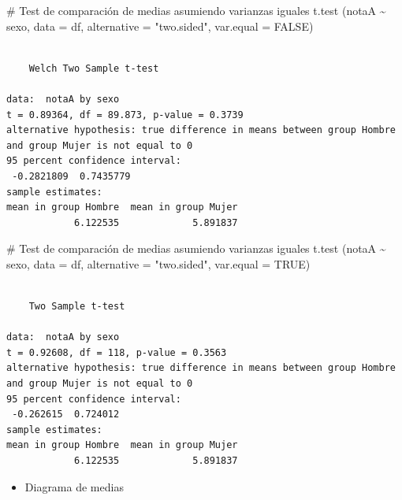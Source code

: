 \documentclass[
  a4paper,
]{scrreport}
\newenvironment{Shaded}{\begin{snugshade}}{\end{snugshade}}
\newcommand{\AttributeTok}[1]{\textcolor[rgb]{0.40,0.45,0.13}{#1}}
\newcommand{\CommentTok}[1]{\textcolor[rgb]{0.37,0.37,0.37}{#1}}
\newcommand{\ConstantTok}[1]{\textcolor[rgb]{0.56,0.35,0.01}{#1}}
\newcommand{\FunctionTok}[1]{\textcolor[rgb]{0.28,0.35,0.67}{#1}}
\newcommand{\NormalTok}[1]{\textcolor[rgb]{0.00,0.23,0.31}{#1}}
\newcommand{\SpecialCharTok}[1]{\textcolor[rgb]{0.37,0.37,0.37}{#1}}
\newcommand{\StringTok}[1]{\textcolor[rgb]{0.13,0.47,0.30}{#1}}
\providecommand{\tightlist}{%
  \setlength{\itemsep}{0pt}\setlength{\parskip}{0pt}}\usepackage{longtable,booktabs,array}
\theoremstyle{definition}
\theoremstyle{definition}
\theoremstyle{remark}
\begin{document}
\begin{Shaded}
\begin{Highlighting}[]
\CommentTok{\# Test de comparación de medias asumiendo varianzas iguales}
\FunctionTok{t.test}\NormalTok{ (notaA }\SpecialCharTok{\textasciitilde{}}\NormalTok{ sexo, }\AttributeTok{data =}\NormalTok{ df, }\AttributeTok{alternative =} \StringTok{"two.sided"}\NormalTok{, }\AttributeTok{var.equal =} \ConstantTok{FALSE}\NormalTok{)}
\end{Highlighting}
\end{Shaded}

\begin{verbatim}

    Welch Two Sample t-test

data:  notaA by sexo
t = 0.89364, df = 89.873, p-value = 0.3739
alternative hypothesis: true difference in means between group Hombre and group Mujer is not equal to 0
95 percent confidence interval:
 -0.2821809  0.7435779
sample estimates:
mean in group Hombre  mean in group Mujer 
            6.122535             5.891837 
\end{verbatim}

\begin{Shaded}
\begin{Highlighting}[]
\CommentTok{\# Test de comparación de medias asumiendo varianzas iguales}
\FunctionTok{t.test}\NormalTok{ (notaA }\SpecialCharTok{\textasciitilde{}}\NormalTok{ sexo, }\AttributeTok{data =}\NormalTok{ df, }\AttributeTok{alternative =} \StringTok{"two.sided"}\NormalTok{, }\AttributeTok{var.equal =} \ConstantTok{TRUE}\NormalTok{)}
\end{Highlighting}
\end{Shaded}

\begin{verbatim}

    Two Sample t-test

data:  notaA by sexo
t = 0.92608, df = 118, p-value = 0.3563
alternative hypothesis: true difference in means between group Hombre and group Mujer is not equal to 0
95 percent confidence interval:
 -0.262615  0.724012
sample estimates:
mean in group Hombre  mean in group Mujer 
            6.122535             5.891837 
\end{verbatim}

\begin{itemize}
\tightlist
\item
  Diagrama de medias
\end{itemize}
\end{document}
